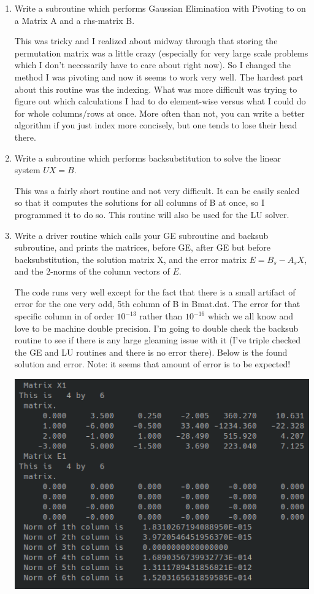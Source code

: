 \documentclass{article}
\begin{document}
\begin{enumerate}
\item Write a subroutine which performs Gaussian Elimination with Pivoting to on a Matrix A and a rhs-matrix B. 

This was tricky and I realized about midway through that storing the permutation matrix was a little crazy (especially for very large scale problems which I don't necessarily have to care about right now). So I changed the method I was pivoting and now it seems to work very well. The hardest part about this routine was the indexing. What was more difficult was trying to figure out which calculations I had to do element-wise versus what I could do for whole columns/rows at once. More often than not, you can write a better algorithm if you just index more concisely, but one tends to lose their head there. 

\item Write a subroutine which performs backsubstitution to solve the linear system $UX = B$. 

This was a fairly short routine and not very difficult. It can be easily scaled so that it computes the solutions for all columns of B at once, so I programmed it to do so. This routine will also be used for the LU solver.
 
\item Write a driver routine which calls your GE subroutine and backsub subroutine, and prints the matrices, before GE, after GE but before backsubstitution, the solution matrix X, and the error matrix $E = B_s - A_sX$, and the 2-norms of the column vectors of $E$. 

The code runs very well except for the fact that there is a small artifact of error for the one very odd, 5th column of B in Bmat.dat. The error for that specific column in of order $10^{-13}$ rather than $10^{-16}$ which we all know and love to be machine double precision. I'm going to double check the backsub routine to see if there is any large gleaming issue with it (I've triple checked the GE and LU routines and there is no error there). Below is the found solution and error. Note: it seems that amount of error is to be expected!

\begin{center}
    \includegraphics[width = .6\textwidth]{files/GEsol.png}
\end{center}

\end{enumerate}
\end{document}
